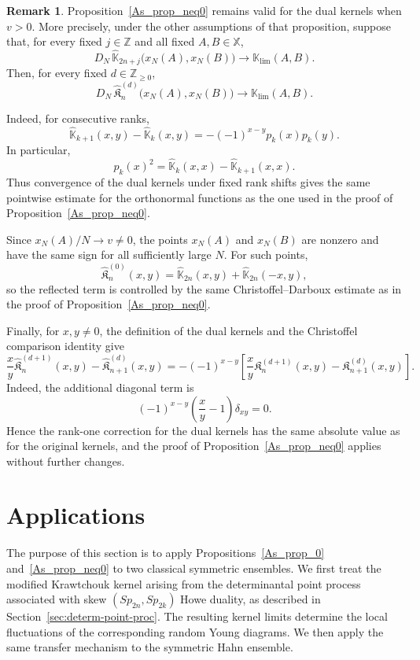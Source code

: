\documentclass[reqno,11pt]{amsart}
\newcommand{\Khat}{\widehat{\mathfrak{K}}}
\newcommand{\Sp}{Sp}
\newcommand{\ZZ}{\mathbb{Z}}
\theoremstyle{plain}
\theoremstyle{definition}
\newtheorem{remark}[thm]{Remark}
\numberwithin{equation}{section}
\begin{document}
\begin{remark}\label{dual_kernels}
Proposition~\ref{As_prop_neq0} remains valid for the dual kernels when $v>0$.
More precisely, under the other assumptions of that proposition, suppose that, for every fixed \(j\in\ZZ\) and all fixed
\(A,B\in\mathbb X\),
\[
D_N\,
\widehat{\mathbb K}_{2n+j}
\bigl(x_N(A),x_N(B)\bigr)
\longrightarrow
\mathbb K_{\lim}(A,B).
\]
Then, for every fixed \(d\in\ZZ_{\geq0}\),
\[
D_N\,
\Khat^{(d)}_n
\bigl(x_N(A),x_N(B)\bigr)
\longrightarrow
\mathbb K_{\lim}(A,B).
\]

Indeed, for consecutive ranks,
\[
\widehat{\mathbb K}_{k+1}(x,y)
-
\widehat{\mathbb K}_{k}(x,y)
=
-(-1)^{x-y}p_k(x)p_k(y).
\]
In particular,
\[
p_k(x)^2
=
\widehat{\mathbb K}_{k}(x,x)
-
\widehat{\mathbb K}_{k+1}(x,x).
\]
Thus convergence of the dual kernels under fixed rank shifts gives the same pointwise estimate for the orthonormal functions as the one used in the proof of Proposition~\ref{As_prop_neq0}.

Since \(x_N(A)/N\to v\neq0\), the points \(x_N(A)\) and \(x_N(B)\)
are nonzero and have the same sign for all sufficiently large \(N\).
For such points,
\[
\Khat^{(0)}_n(x,y)
=
\widehat{\mathbb K}_{2n}(x,y)
+
\widehat{\mathbb K}_{2n}(-x,y),
\]
so the reflected term is controlled by the same
Christoffel--Darboux estimate as in the proof of
Proposition~\ref{As_prop_neq0}.

Finally, for \(x,y\neq0\), the definition of the dual kernels and the
Christoffel comparison identity give
\[
\frac{x}{y}\Khat^{(d+1)}_n(x,y)
-
\Khat^{(d)}_{n+1}(x,y)
=
-(-1)^{x-y}
\left[
\frac{x}{y}\mathfrak K^{(d+1)}_n(x,y)
-
\mathfrak K^{(d)}_{n+1}(x,y)
\right].
\]
Indeed, the additional diagonal term is
\[
(-1)^{x-y}
\left(\frac{x}{y}-1\right)\delta_{xy}=0.
\]
Hence the rank-one correction for the dual kernels has the same
absolute value as for the original kernels, and the proof of
Proposition~\ref{As_prop_neq0} applies without further changes.
\end{remark}

\section{Applications}
\label{sec:examples}
The purpose of this section is to apply Propositions~\ref{As_prop_0} and~\ref{As_prop_neq0} to two classical symmetric ensembles. We first treat the modified Krawtchouk kernel arising from the determinantal point process associated with skew $(\Sp_{2n},\Sp_{2k})$ Howe duality, as described in Section~\ref{sec:determ-point-proc}. The resulting kernel limits determine the local fluctuations of the corresponding random Young diagrams. We then apply the same transfer mechanism to the symmetric Hahn ensemble.
\end{document}
